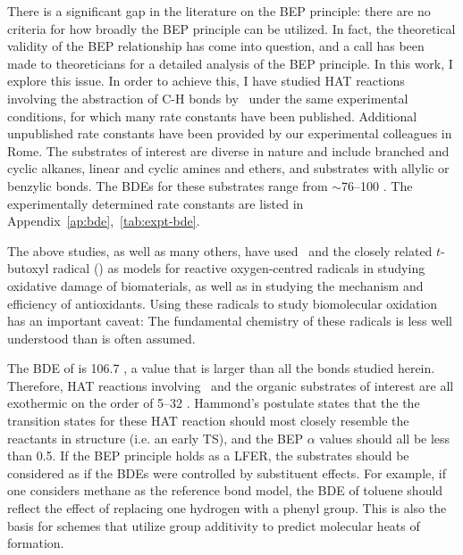 There is a significant gap in the literature on the BEP principle: there are no criteria for how broadly the BEP principle can be utilized. In fact, the theoretical validity of the BEP relationship has come into question, and a call has been made to theoreticians for a detailed analysis of the BEP principle.\cite{vanSanten2010} In this work, I explore this issue. In order to achieve this, I have studied HAT reactions involving the abstraction of C-H bonds by \cumo\ under the same experimental conditions, for which many rate constants have been published.\cite{Bietti2010, Bietti2011, Pischel2001, Salamone2011, Salamone2012, Salamone2012a, Salamone2013, Salamone2015} Additional unpublished rate constants have been provided by our experimental colleagues in Rome. The substrates of interest are diverse in nature and include branched and cyclic alkanes, linear and cyclic amines and ethers, and substrates with allylic or benzylic  bonds. The BDEs for these substrates range from $\sim$76--100 \kcalmol. The experimentally determined rate constants are listed in Appendix~\ref{ap:bde},~\ref{tab:expt-bde}.

The above studies, as well as many others, have used \cumo\ and the closely related $t$-butoxyl radical () as models for reactive oxygen-centred radicals in studying oxidative damage of biomaterials,\cite{Adam1998, Adam2002, Jones2003} as well as in studying the mechanism and efficiency of antioxidants.\cite{MacFaul1996, Valgimigli1996, Valgimigli1999, Jovanovic1999, Sortino2003} Using these radicals to study biomolecular oxidation has an important caveat: The fundamental chemistry of these radicals is less well understood than is often assumed. \cite{Tanko2001, Finn2004, Salamone2011b}

The BDE of  is 106.7 \kcalmol, a value that is larger than all the  bonds studied herein. Therefore, HAT reactions involving \cumo\ and the organic substrates of interest are all exothermic on the order of 5--32 \kcalmol. Hammond's postulate\cite{Hammond1955} states that the the transition states for these HAT reaction should most closely resemble the reactants in structure (i.e.  an early TS), and the BEP $\alpha$ values should all be less than 0.5.\cite{Russell1973} If the BEP principle holds as a LFER, the substrates should be considered as if the BDEs were controlled by substituent effects. For example, if one considers methane as the reference  bond model, the BDE of toluene should reflect the effect of replacing one hydrogen with a phenyl group. This is also the basis for schemes that utilize group additivity to predict molecular heats of formation.\cite{Benson1976}

